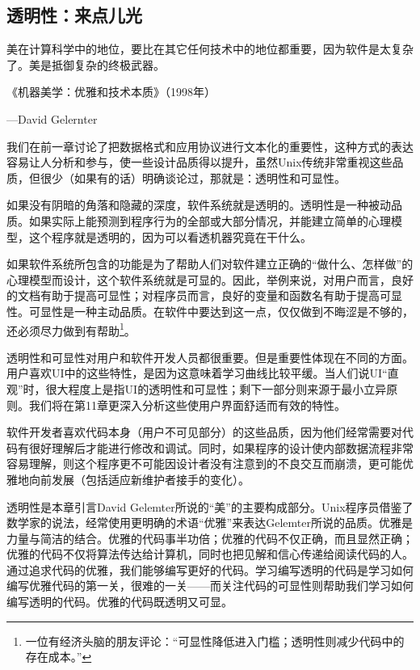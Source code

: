 \documentclass[12pt,oneside]{ctexbook}
\begin{document}
\begin{common-format}
\chapter{透明性：来点儿光}
\begin{flushright}
\begin{notecard}{28em}
美在计算科学中的地位，要比在其它任何技术中的地位都重要，因为软件是太复杂了。美是抵御复杂的终极武器。

{\hfill 《机器美学：优雅和技术本质》（1998年）}

{\hfill —David Gelernter}
\end{notecard}
\end{flushright}

我们在前一章讨论了把数据格式和应用协议进行文本化的重要性，这种方式的表达容易让人分析和参与，使一些设计品质得以提升，虽然Unix传统非常重视这些品质，但很少（如果有的话）明确谈论过，那就是：透明性和可显性。

如果没有阴暗的角落和隐藏的深度，软件系统就是透明的。透明性是一种被动品质。如果实际上能预测到程序行为的全部或大部分情况，并能建立简单的心理模型，这个程序就是透明的，因为可以看透机器究竟在干什么。

如果软件系统所包含的功能是为了帮助人们对软件建立正确的“做什么、怎样做”的心理模型而设计，这个软件系统就是可显的。因此，举例来说，对用户而言，良好的文档有助于提高可显性；对程序员而言，良好的变量和函数名有助于提高可显性。可显性是一种主动品质。在软件中要达到这一点，仅仅做到不晦涩是不够的，还必须尽力做到有帮助\footnote{一位有经济头脑的朋友评论：“可显性降低进入门槛；透明性则减少代码中的存在成本。”}。

透明性和可显性对用户和软件开发人员都很重要。但是重要性体现在不同的方面。用户喜欢UI中的这些特性，是因为这意味着学习曲线比较平缓。当人们说UI“直观”时，很大程度上是指UI的透明性和可显性；剩下一部分则来源于最小立异原则。我们将在第11章更深入分析这些使用户界面舒适而有效的特性。

软件开发者喜欢代码本身（用户不可见部分）的这些品质，因为他们经常需要对代码有很好理解后才能进行修改和调试。同时，如果程序的设计使内部数据流程非常容易理解，则这个程序更不可能因设计者没有注意到的不良交互而崩溃，更可能优雅地向前发展（包括适应新维护者接手的变化）。

透明性是本章引言David Gelemter所说的“美”的主要构成部分。Unix程序员借鉴了数学家的说法，经常使用更明确的术语“优雅”来表达Gelemter所说的品质。优雅是力量与简洁的结合。优雅的代码事半功倍；优雅的代码不仅正确，而且显然正确；优雅的代码不仅将算法传达给计算机，同时也把见解和信心传递给阅读代码的人。通过追求代码的优雅，我们能够编写更好的代码。学习编写透明的代码是学习如何编写优雅代码的第一关，很难的一关——而关注代码的可显性则帮助我们学习如何编写透明的代码。优雅的代码既透明又可显。


\end{common-format}
\end{document}
